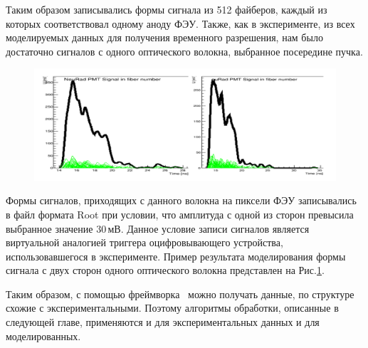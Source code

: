 Таким образом записывались формы сигнала из 512 файберов, каждый из которых соответствовал одному аноду ФЭУ. Также, как в эксперименте, из всех моделируемых данных для получения временного разрешения, нам было достаточно сигналов с одного оптического волокна, выбранное посередине пучка.

\begin{figure}[!ht]
	\centering
	\includegraphics[width=\linewidth]{simsignal.png}
	\label{ris:simsignal}
\end{figure}

Формы сигналов, приходящих с данного волокна на пиксели ФЭУ записывались в файл формата Root \cite{root} при условии, что амплитуда с одной из сторон превысила выбранное значение 30\,мВ. Данное условие записи  сигналов является виртуальной аналогией триггера оцифровывающего устройства, использовавшегося в эксперименте.
Пример результата моделирования формы сигнала с двух сторон одного оптического волокна представлен на Рис.\ref{ris:simsignal}.

Таким образом, с помощью фреймворка \er\ можно получать данные, по структуре схожие с экспериментальными. Поэтому алгоритмы обработки, описанные в следующей главе, применяются и для экспериментальных данных и для моделированных. 
